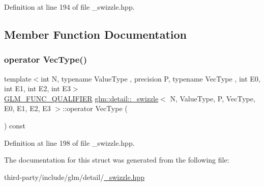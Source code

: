 Definition at line 194 of file \+\_\+swizzle.\+hpp.



\subsection{Member Function Documentation}
\mbox{\label{structglm_1_1detail_1_1__swizzle_a969ed3f7ce07614769a5f623045d1027}} 
\subsubsection{\texorpdfstring{operator Vec\+Type()}{operator VecType()}}
{\footnotesize\ttfamily template$<$int N, typename Value\+Type , precision P, typename Vec\+Type , int E0, int E1, int E2, int E3$>$ \\
\hyperlink{setup_8hpp_a33fdea6f91c5f834105f7415e2a64407}{G\+L\+M\+\_\+\+F\+U\+N\+C\+\_\+\+Q\+U\+A\+L\+I\+F\+I\+ER} \hyperlink{structglm_1_1detail_1_1__swizzle}{glm\+::detail\+::\+\_\+swizzle}$<$ N, Value\+Type, P, Vec\+Type, E0, E1, E2, E3 $>$\+::operator Vec\+Type (\begin{DoxyParamCaption}{ }\end{DoxyParamCaption}) const\hspace{0.3cm}{\ttfamily [inline]}}



Definition at line 198 of file \+\_\+swizzle.\+hpp.



The documentation for this struct was generated from the following file\+:\begin{DoxyCompactItemize}
\item 
third-\/party/include/glm/detail/\hyperlink{__swizzle_8hpp}{\+\_\+swizzle.\+hpp}\end{DoxyCompactItemize}
